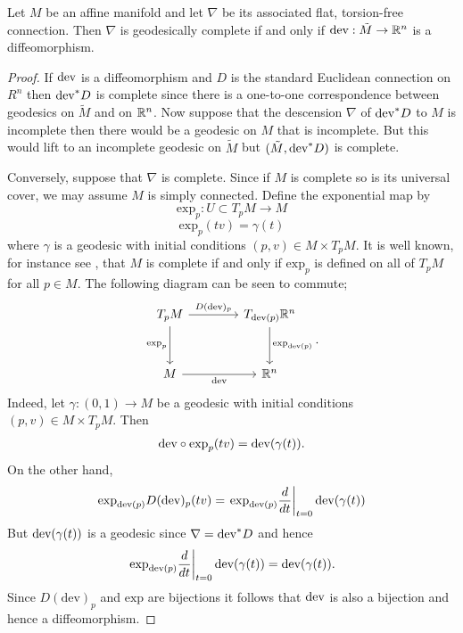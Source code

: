 \begin{theorem}
    Let $M$ be an affine manifold and let $\nabla$ be its associated flat, torsion-free connection. Then $\nabla$ is
    geodesically complete if and only if $\text{dev} : \tilde{M} \to \mathbb{R}^n$ is a diffeomorphism.
\end{theorem}
\begin{proof}
    If $\text{dev}$ is a diffeomorphism and $D$ is the standard Euclidean connection on $R^n$ then $\text{dev}^* D$ is complete since there is a one-to-one correspondence between
    geodesics on $\tilde{M}$ and on $\mathbb{R}^n$. Now suppose that the descension $\nabla$ of $\text{dev}^* D$ to $M$ is incomplete then there would be a geodesic on $M$ that is incomplete. But this would
    lift to an incomplete geodesic on $\tilde{M}$ but $(\tilde{M}, \text{dev}^* D)$ is complete.

    Conversely, suppose that $\nabla$ is complete. Since if $M$ is complete so is
    its universal cover, we may assume $M$ is simply connected. Define the
    exponential map by $$ \text{exp}_p: U \subset T_pM \to M $$ $$ \text{exp}_p(tv)
        = \gamma(t) $$ where $\gamma$ is a geodesic with initial conditions $(p, v) \in
        M \times T_pM$. It is well known, for instance see \cite{goldman2022geometric},
    that $M$ is complete if and only if $\text{exp}_p$ is defined on all of $T_pM$
    for all $p \in M$. The following diagram can be seen to commute;
    \[
        \begin{tikzcd}[column sep=4em, row sep=3em]
            T_pM
            \arrow[r, "{D(\mathrm{dev})_p}"]
            \arrow[d, "\mathrm{exp}_p"']
            &
            T_{\mathrm{dev}(p)}\R^n
            \arrow[d, "\mathrm{exp}_{\dev(p)}"]
            \\
            M
            \arrow[r, "\mathrm{dev}"']
            &
            \R^n
        \end{tikzcd}.
    \]
    Indeed, let $\gamma: (0,1) \to M$ be a geodesic with initial conditions $(p,v)
        \in M \times T_pM$. Then
    \begin{align*}
        \text{dev} \circ \text{exp}_p(tv) = \text{dev} (\gamma(t)).
    \end{align*}
    On the other hand,
    \begin{align}
        \text{exp}_{\text{dev} (p)}D(\text{dev})_p(tv) = \left.\text{exp}_{\text{dev} (p)} \dfrac{d}{dt}\right\vert_{t=0}\text{dev} (\gamma(t))
    \end{align}
    But $\text{dev}(\gamma(t))$ is a geodesic since $\nabla = \text{dev}^* D$ and hence
    $$ \left.\text{exp}_{\text{dev} (p)} \dfrac{d}{dt}\right\vert_{t=0}\text{dev} (\gamma(t)) = \text{dev} (\gamma(t)).$$
    Since $D(\mathrm{dev})_p$ and $\text{exp}$ are bijections it follows that
    $\text{dev}$ is also a bijection and hence a diffeomorphism.
\end{proof}

